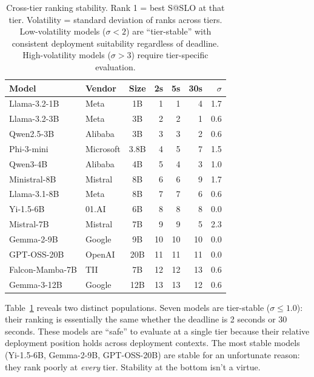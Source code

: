 \documentclass[11pt]{article}
\begin{document}
\begin{table}[t]
\centering
\caption{Cross-tier ranking stability.  Rank 1 = best S@SLO at that tier.  Volatility = standard deviation of ranks across tiers.  Low-volatility models ($\sigma < 2$) are ``tier-stable'' with consistent deployment suitability regardless of deadline.  High-volatility models ($\sigma > 3$) require tier-specific evaluation.}
\label{tab:rank-stability}
\small
\begin{tabular}{llc rrr r}
\toprule
\textbf{Model} & \textbf{Vendor} & \textbf{Size} & \textbf{2s} & \textbf{5s} & \textbf{30s} & \textbf{$\sigma$} \\
\midrule
Llama-3.2-1B     & Meta      & 1B   & 1  & 1  & 4  & 1.7 \\
Llama-3.2-3B     & Meta      & 3B   & 2  & 2  & 1  & 0.6 \\
Qwen2.5-3B       & Alibaba   & 3B   & 3  & 3  & 2  & 0.6 \\
Phi-3-mini        & Microsoft & 3.8B & 4  & 5  & 7  & 1.5 \\
Qwen3-4B          & Alibaba   & 4B   & 5  & 4  & 3  & 1.0 \\
Ministral-8B      & Mistral   & 8B   & 6  & 6  & 9  & 1.7 \\
Llama-3.1-8B      & Meta      & 8B   & 7  & 7  & 6  & 0.6 \\
Yi-1.5-6B         & 01.AI     & 6B   & 8  & 8  & 8  & 0.0 \\
Mistral-7B        & Mistral   & 7B   & 9  & 9  & 5  & 2.3 \\
Gemma-2-9B        & Google    & 9B   & 10 & 10 & 10 & 0.0 \\
GPT-OSS-20B       & OpenAI    & 20B  & 11 & 11 & 11 & 0.0 \\
Falcon-Mamba-7B   & TII       & 7B   & 12 & 12 & 13 & 0.6 \\
Gemma-3-12B       & Google    & 12B  & 13 & 13 & 12 & 0.6 \\
\bottomrule
\end{tabular}
\end{table}

Table~\ref{tab:rank-stability} reveals two distinct populations.  Seven models are tier-stable ($\sigma \leq 1.0$): their ranking is essentially the same whether the deadline is 2 seconds or 30 seconds.  These models are ``safe'' to evaluate at a single tier because their relative deployment position holds across deployment contexts.  The most stable models (Yi-1.5-6B, Gemma-2-9B, GPT-OSS-20B) are stable for an unfortunate reason: they rank poorly at \emph{every} tier.  Stability at the bottom isn't a virtue.
\end{document}
